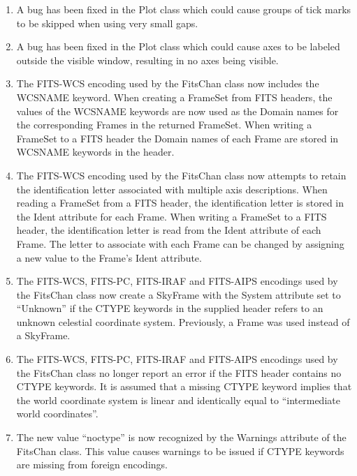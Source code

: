 \documentclass[twoside,11pt]{article}
\newcommand{\htmlref}[2]{#1}
\begin{document}
\begin{enumerate}


\item A bug has been fixed in the \htmlref{Plot}{Plot} class which could cause groups 
of tick marks to be skipped when using very small gaps.

\item A bug has been fixed in the Plot class which could cause axes to be
labeled outside the visible window, resulting in no axes being visible.

\item The FITS-WCS encoding used by the \htmlref{FitsChan}{FitsChan} class now includes the
WCSNAME keyword. When creating a \htmlref{FrameSet}{FrameSet} from FITS headers, the values of 
the WCSNAME keywords are now used as the \htmlref{Domain}{Domain} names for the corresponding 
Frames in the returned FrameSet. When writing a FrameSet to a FITS header
the Domain names of each \htmlref{Frame}{Frame} are stored in WCSNAME keywords in the
header. 

\item The FITS-WCS encoding used by the FitsChan class now attempts to
retain the identification letter associated with multiple axis
descriptions. When reading a FrameSet from a FITS header, the identification 
letter is stored in the \htmlref{Ident}{Ident} attribute for each Frame. When writing a
FrameSet to a FITS header, the identification letter is read from the
Ident attribute of each Frame. The letter to associate with each Frame
can be changed by assigning a new value to the Frame's Ident attribute.

\item The FITS-WCS, FITS-PC, FITS-IRAF and FITS-AIPS encodings used by the 
FitsChan class now create a \htmlref{SkyFrame}{SkyFrame} with the \htmlref{System}{System} attribute set to 
``Unknown'' if the CTYPE keywords in the supplied header refers to an
unknown celestial coordinate system. Previously, a Frame was used instead
of a SkyFrame.

\item The FITS-WCS, FITS-PC, FITS-IRAF and FITS-AIPS encodings used by the 
FitsChan class no longer report an error if the FITS header contains no
CTYPE keywords. It is assumed that a missing CTYPE keyword implies that 
the world coordinate system is linear and identically equal to
``intermediate world coordinates''.

\item The new value ``noctype'' is now recognized by the \htmlref{Warnings}{Warnings} attribute 
of the FitsChan class. This value causes warnings to be issued if CTYPE
keywords are missing from foreign encodings.


\end{enumerate}
\end{document}
